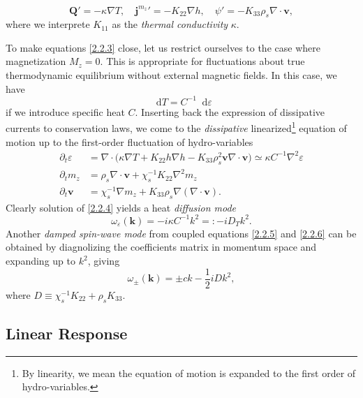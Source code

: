 \documentclass[10pt,nofootinbib]{revtex4}
\newcommand*\dd{\mathop{}\!\mathrm{d}}
\begin{document}
			\begin{equation}\label{2.2.3}
				\bm{Q}'=-\kappa\nabla T,\quad {\bm{j}^{m_z}}'=-K_{22}\nabla h,\quad \psi'=-K_{33}\rho_s\nabla\cdot\bm{v},
			\end{equation}
			where we interprete $K_{11}$ as the \emph{thermal conductivity} $\kappa$.\par
			To make equations \eqref{2.2.3} close, let us restrict ourselves to the case where magnetization $M_z=0$. This is appropriate for fluctuations about true thermodynamic equilibrium without external magnetic fields. In this case, we have
			\begin{equation*}
				\dd T=C^{-1}\dd\varepsilon
			\end{equation*}
			if we introduce specific heat $C$. Inserting back the expression of dissipative currents to conservation laws, we come to the \emph{dissipative} linearized\footnote{By linearity, we mean the equation of motion is expanded to the first order of hydro-variables.} equation of motion up to the first-order fluctuation of hydro-variables
			\begin{align}
				\partial_t \varepsilon&=\nabla\cdot\bigg(\kappa\nabla T+K_{22}h\nabla h-K_{33}\rho_s^2\bm{v}\nabla\cdot\bm{v}\bigg)\simeq\kappa C^{-1}\nabla^2\varepsilon\label{2.2.4}\\
				\partial_t m_z&=\rho_s\nabla\cdot\bm{v}+\chi_s^{-1}K_{22}\nabla^2m_z\label{2.2.5}\\
				\partial_t\bm{v}&=\chi_s^{-1}\nabla m_z+K_{33}\rho_s\nabla(\nabla\cdot\bm{v})\label{2.2.6}.
			\end{align}
			Clearly solution of \eqref{2.2.4} yields a heat \emph{diffusion mode}
			\begin{equation}\label{2.2.7}
				\omega_\varepsilon(\bm{k})=-i\kappa C^{-1}k^2=:-iD_Tk^2.
			\end{equation}
			Another \emph{damped spin-wave mode} from coupled equations \eqref{2.2.5} and \eqref{2.2.6} can be obtained by diagnolizing the coefficients matrix in momentum space and expanding up to $k^2$, giving
			\begin{equation}\label{2.2.8}
				\omega_{\pm}(\bm{k})=\pm ck-\dfrac{1}{2}iDk^2,
			\end{equation}
			where $D\equiv\chi_s^{-1}K_{22}+\rho_s K_{33}$.
	\subsection{Linear Response}
\end{document}
